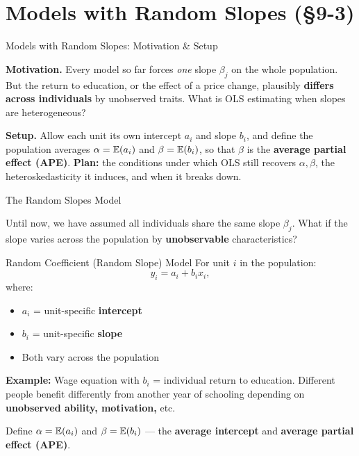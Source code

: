 \documentclass[aspectratio=169, 12pt]{beamer}
\begin{document}
\section{Models with Random Slopes (\S9-3)}

\begin{frame}{Models with Random Slopes: Motivation \& Setup}

  \begin{highlightbox}
    \textbf{Motivation.} Every model so far forces \emph{one} slope $\beta_j$ on the
    whole population. But the return to education, or the effect of a price change,
    plausibly \textbf{differs across individuals} by unobserved traits. What is OLS
    estimating when slopes are heterogeneous?
  \end{highlightbox}

  \begin{keybox}
    \textbf{Setup.} Allow each unit its own intercept $a_i$ and slope $b_i$, and
    define the population averages $\alpha = \operatorname{\mathbb{E}}(a_i)$ and $\beta = \operatorname{\mathbb{E}}(b_i)$, so that
    $\beta$ is the \textbf{average partial effect (APE)}. \textbf{Plan:} the
    conditions under which OLS still recovers $\alpha,\beta$, the
    heteroskedasticity it induces, and when it breaks down.
  \end{keybox}

\end{frame}

\begin{frame}[shrink=25]{The Random Slopes Model}

  Until now, we have assumed all individuals share the same slope $\beta_j$.
  What if the slope varies across the population by \textbf{unobservable} characteristics?

  \begin{definitionbox}{Random Coefficient (Random Slope) Model}
    For unit $i$ in the population:
    \[
      y_i = a_i + b_i x_i, \tag{9.17}
    \]
    where:
    \begin{itemize}\setlength{\itemsep}{1pt}
      \item $a_i$ = unit-specific \textbf{intercept}
      \item $b_i$ = unit-specific \textbf{slope}
      \item Both vary across the population
    \end{itemize}
  \end{definitionbox}

  \textbf{Example:} Wage equation with $b_i$ = individual return to education. Different people
  benefit differently from another year of schooling depending on \textbf{unobserved ability,
  motivation,} etc.

  Define $\alpha = \operatorname{\mathbb{E}}(a_i)$ and $\beta = \operatorname{\mathbb{E}}(b_i)$ — the \textbf{average intercept} and
  \textbf{average partial effect (APE)}.

\end{frame}
\end{document}
